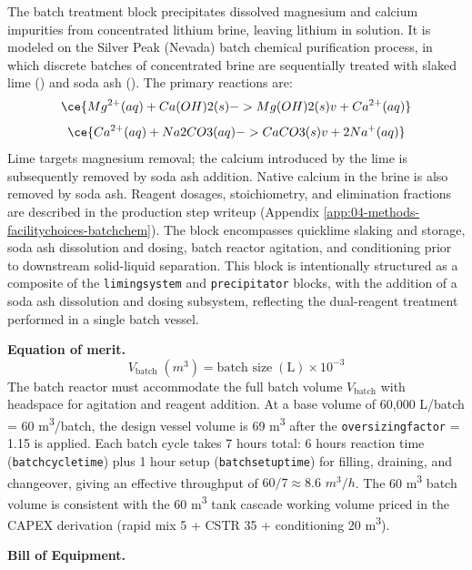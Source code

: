 \documentclass{article}
\renewcommand\_{\textunderscore\allowbreak}
\begin{document}
The batch treatment block precipitates dissolved magnesium and calcium impurities from concentrated lithium brine, leaving lithium in solution. It is modeled on the Silver Peak (Nevada) batch chemical purification process, in which discrete batches of concentrated brine are sequentially treated with slaked lime () and soda ash (). The primary reactions are:
\begin{equation}
	\ce{Mg^{2+}(aq) + Ca(OH)2(s) -> Mg(OH)2(s) v + Ca^{2+}(aq)}
\end{equation}
\begin{equation}
	\ce{Ca^{2+}(aq) + Na2CO3(aq) -> CaCO3(s) v + 2Na^{+}(aq)}
\end{equation}
Lime targets magnesium removal; the calcium introduced by the lime is subsequently removed by soda ash addition. Native calcium in the brine is also removed by soda ash. Reagent dosages, stoichiometry, and elimination fractions are described in the production step writeup (Appendix \ref{app:04-methods-facilitychoices-batchchem}). The block encompasses quicklime slaking and storage, soda ash dissolution and dosing, batch reactor agitation, and conditioning prior to downstream solid-liquid separation. This block is intentionally structured as a composite of the \texttt{liming\_system} and \texttt{precipitator} blocks, with the addition of a soda ash dissolution and dosing subsystem, reflecting the dual-reagent treatment performed in a single batch vessel.

\medskip
\noindent\textbf{Equation of merit.}\quad
\[
	V_\text{batch}\;(\si{m^3}) = \text{batch size}\;(\text{L}) \times 10^{-3}
\]
The batch reactor must accommodate the full batch volume $V_\text{batch}$ with headspace for agitation and reagent addition. At a base volume of 60,000 L/batch = 60 \si{m^3/batch}, the design vessel volume is 69 \si{m^3} after the \texttt{oversizing\_factor} = 1.15 is applied. Each batch cycle takes 7 hours total: 6 hours reaction time (\texttt{batch\_cycle\_time}) plus 1 hour setup (\texttt{batch\_setup\_time}) for filling, draining, and changeover, giving an effective throughput of $60/7 \approx 8.6$ $\si{m^3/h}$. The 60 \si{m^3} batch volume is consistent with the 60 \si{m^3} tank cascade working volume priced in the CAPEX derivation (rapid mix 5 + CSTR 35 + conditioning 20 \si{m^3}).

\medskip
\noindent\textbf{Bill of Equipment.}\quad
\end{document}
